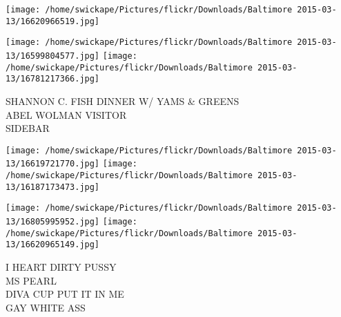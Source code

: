 \documentclass[10pt,letterpaper]{article}
\begin{document}
\texttt{[image: /home/swickape/Pictures/flickr/Downloads/Baltimore 2015-03-13/16620966519.jpg]}

\vspace{0.25in}
\texttt{[image: /home/swickape/Pictures/flickr/Downloads/Baltimore 2015-03-13/16599804577.jpg]}
\texttt{[image: /home/swickape/Pictures/flickr/Downloads/Baltimore 2015-03-13/16781217366.jpg]}

SHANNON C. FISH DINNER W/ YAMS \& GREENS\\
ABEL WOLMAN VISITOR\\
SIDEBAR\\
\pagebreak

\texttt{[image: /home/swickape/Pictures/flickr/Downloads/Baltimore 2015-03-13/16619721770.jpg]}
\texttt{[image: /home/swickape/Pictures/flickr/Downloads/Baltimore 2015-03-13/16187173473.jpg]}

\texttt{[image: /home/swickape/Pictures/flickr/Downloads/Baltimore 2015-03-13/16805995952.jpg]}
\texttt{[image: /home/swickape/Pictures/flickr/Downloads/Baltimore 2015-03-13/16620965149.jpg]}

I HEART DIRTY PUSSY\\
MS PEARL\\
DIVA CUP PUT IT IN ME\\
GAY WHITE ASS\\
\pagebreak
\end{document}
